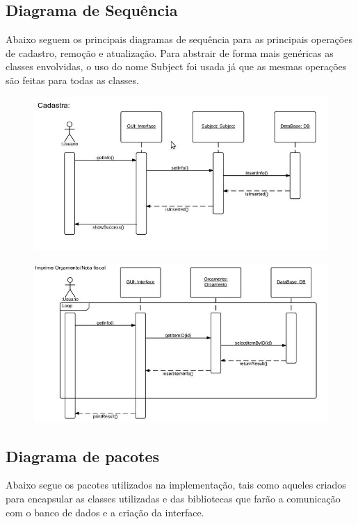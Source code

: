 \documentclass[a4paper,10pt]{article}
\begin{document}
\subsection{Diagrama de Sequência}


Abaixo seguem os principais diagramas de sequência para as principais operações de cadastro, remoção e atualização. Para abstrair de forma mais genéricas as classes envolvidas, o uso do nome Subject foi usada já que as mesmas operações são feitas para todas as classes.

\begin{figure}[H]
\centering
\includegraphics[width=1\textwidth]{pic/sequencia_1.jpeg}
\end{figure}

\begin{figure}[H]
\centering
\includegraphics[width=1\textwidth]{pic/sequencia_2.jpeg}
\end{figure}

\subsection{Diagrama de pacotes}

Abaixo segue os pacotes utilizados na implementação, tais como aqueles criados para encapsular as classes utilizadas e das bibliotecas que farão a comunicação com o banco de dados e a criação da interface.
\end{document}
